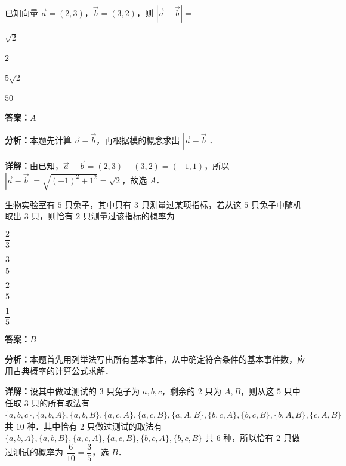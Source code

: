 \begin{question}[points=5]
已知向量 $\vec{a}=(2,3)$，$\vec{b}=(3,2)$，则 $|\vec{a}-\vec{b}|=$
\begin{choices}
  \item $\sqrt{2}$
  \item $2$
  \item $5\sqrt{2}$
  \item $50$
\end{choices}
\begin{solution}
\textbf{答案：}$A$

\textbf{分析：}本题先计算 $\vec{a}-\vec{b}$，再根据模的概念求出 $|\vec{a}-\vec{b}|$．

\textbf{详解：}由已知，$\vec{a}-\vec{b}=(2,3)-(3,2)=(-1,1)$，所以 $|\vec{a}-\vec{b}|=\sqrt{(-1)^2+1^2}=\sqrt{2}$，故选 $A$．
\end{solution}
\end{question}

\begin{question}[points=5]
生物实验室有 $5$ 只兔子，其中只有 $3$ 只测量过某项指标，若从这 $5$ 只兔子中随机取出 $3$ 只，则恰有 $2$ 只测量过该指标的概率为
\begin{choices}
  \item $\dfrac{2}{3}$
  \item $\dfrac{3}{5}$
  \item $\dfrac{2}{5}$
  \item $\dfrac{1}{5}$
\end{choices}
\begin{solution}
\textbf{答案：}$B$

\textbf{分析：}本题首先用列举法写出所有基本事件，从中确定符合条件的基本事件数，应用古典概率的计算公式求解．

\textbf{详解：}设其中做过测试的 $3$ 只兔子为 $a,b,c$，剩余的 $2$ 只为 $A,B$，则从这 $5$ 只中任取 $3$ 只的所有取法有 $\{a,b,c\},\{a,b,A\},\{a,b,B\},\{a,c,A\},\{a,c,B\},\{a,A,B\},\{b,c,A\},\{b,c,B\},\{b,A,B\},\{c,A,B\}$ 共 $10$ 种．其中恰有 $2$ 只做过测试的取法有 $\{a,b,A\},\{a,b,B\},\{a,c,A\},\{a,c,B\},\{b,c,A\},\{b,c,B\}$ 共 $6$ 种，所以恰有 $2$ 只做过测试的概率为 $\dfrac{6}{10}=\dfrac{3}{5}$，选 $B$．
\end{solution}
\end{question}

